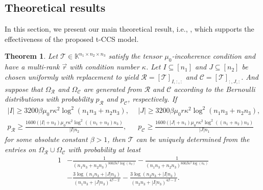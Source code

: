\documentclass[twoside,12pt]{article}
\newtheorem{theorem}{Theorem}
\def\mcR{\mathcal{R}}
\def\mcC{\mathcal{C}}
\def\mcR{\mathcal{R}}
\def\mcC{\mathcal{C}}
\begin{document}



 \vspace{-3mm}
\subsection{Theoretical results}\label{sec:theories}
In this section, we present our main theoretical result, i.e., , which supports the effectiveness of the proposed t-CCS model. 
\begin{theorem}\label{thm:samplingcmp4ccs} 
Let $\mathcal{T} \in \mathbb{K}^{n_1 \times n_2 \times n_3}$  satisfy the tensor $\mu_0$-incoherence condition  and have a multi-rank $\vec{r}$ with condition number $\kappa$. Let $I\subseteq [n_1]$ and $J \subseteq[n_2]$ be chosen uniformly with replacement to yield $\mathcal{R}=[\mathcal{T}]_{I,:,:}$ and $\mathcal{C}=[\mathcal{T}]_{:,J,:}$. And suppose that $\Omega_{\mcR}$ and $\Omega_{\mcC}$ are generated from $\mathcal{R}$ and $\mcC$  according to the Bernoulli distributions  with probability $p_{\mathcal{R}}$ and $p_{\mathcal{C}}$,  respectively.   If
\begin{align*}
|I|\geq  3200\beta\mu_0r\kappa^2\log^2(n_1n_3+n_2n_3),~&~
|J|\geq  3200\beta\mu_0r\kappa^2\log^2(n_1n_3+n_2n_3),\\
p_{\mathcal{R}} \geq \frac{1600(|I|+n_2)\mu_0r\kappa^2 \log^2((n_1+n_2)n_3) }{|I|n_2},~&~
p_{\mathcal{C}} \geq \frac{1600(|J|+n_1)\mu_0r\kappa^2 \log^2((n_1+n_2)n_3) }{|J|n_1}\,
\end{align*}
for some absolute constant $\beta>1$, 
then $\mathcal{T}$ can be uniquely determined from the entries on $\Omega_{\mathcal{R}}\cup \Omega_{\mathcal{C}}$ with probability at least
\begin{align*}
   1&-\frac{1}{(n_1n_3+n_2n_3)^{800\beta\kappa^2\log(n_2)}}-\frac{1}{(n_1n_3+n_2n_3)^{800\beta\kappa^2\log(n_1)}}\\
   &-\frac{3\log(n_1n_3+|J|n_3)}{(n_1n_3+|J|n_3)^{4\beta-2}}-\frac{3\log(n_2n_3+|I|n_3)}{(n_2n_3+|I|n_3)^{4\beta-2}}.
\end{align*}
\end{theorem}
\end{document}
